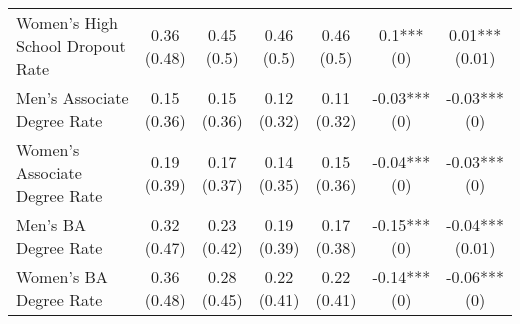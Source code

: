 \begin{landscape}
\begin{ThreePartTable}
\begin{longtable}[t]{>{\raggedright\arraybackslash}p{5cm}cccccc}
\hspace{1em}Women’s High School Dropout Rate & \specialcell{0.36\\(0.48)} & \specialcell{0.45\\(0.5)} & \specialcell{0.46\\(0.5)} & \specialcell{0.46\\(0.5)} & \specialcell{0.1***\\(0)} & \specialcell{0.01***\\(0.01)}\\
\addlinespace
\hspace{1em}Men’s Associate Degree Rate & \specialcell{0.15\\(0.36)} & \specialcell{0.15\\(0.36)} & \specialcell{0.12\\(0.32)} & \specialcell{0.11\\(0.32)} & \specialcell{-0.03***\\(0)} & \specialcell{-0.03***\\(0)}\\
\hspace{1em}Women’s Associate Degree Rate & \specialcell{0.19\\(0.39)} & \specialcell{0.17\\(0.37)} & \specialcell{0.14\\(0.35)} & \specialcell{0.15\\(0.36)} & \specialcell{-0.04***\\(0)} & \specialcell{-0.03***\\(0)}\\
\hspace{1em}Men’s BA Degree Rate & \specialcell{0.32\\(0.47)} & \specialcell{0.23\\(0.42)} & \specialcell{0.19\\(0.39)} & \specialcell{0.17\\(0.38)} & \specialcell{-0.15***\\(0)} & \specialcell{-0.04***\\(0.01)}\\
\hspace{1em}Women’s BA Degree Rate & \specialcell{0.36\\(0.48)} & \specialcell{0.28\\(0.45)} & \specialcell{0.22\\(0.41)} & \specialcell{0.22\\(0.41)} & \specialcell{-0.14***\\(0)} & \specialcell{-0.06***\\(0)}\\

\end{longtable}
\end{ThreePartTable}
\end{landscape}
